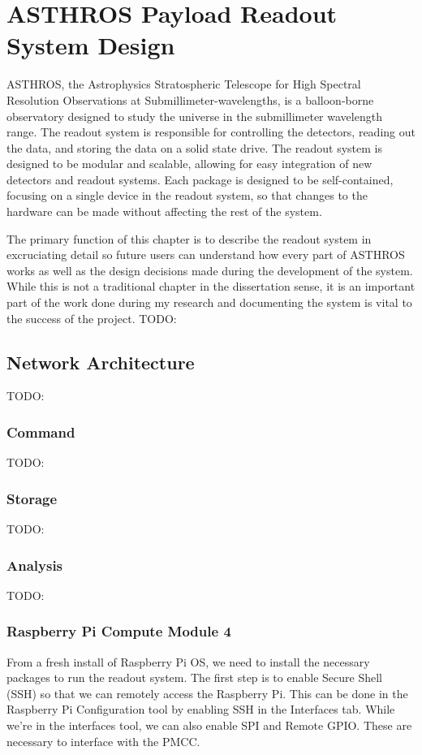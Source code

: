 \chapter[ASTHROS Payload Readout System Design]{ASTHROS Payload Readout System Design}
ASTHROS, the Astrophysics Stratospheric Telescope for High Spectral Resolution Observations at Submillimeter-wavelengths, is a balloon-borne observatory designed to study the universe in the submillimeter wavelength range.
The readout system is responsible for controlling the detectors, reading out the data, and storing the data on a solid state drive.
The readout system is designed to be modular and scalable, allowing for easy integration of new detectors and readout systems.
Each package is designed to be self-contained, focusing on a single device in the readout system, so that changes to the hardware can be made without affecting the rest of the system.

The primary function of this chapter is to describe the readout system in excruciating detail so future users can understand how every part of ASTHROS works as well as the design decisions made during the development of the system.
While this is not a traditional chapter in the dissertation sense, it is an important part of the work done during my research and documenting the system is vital to the success of the project.
TODO:
\section{Network Architecture}
TODO:
\subsection{Command}
TODO:
\subsection{Storage}
TODO:
\subsection{Analysis}
TODO:
\subsection{Raspberry Pi Compute Module 4}
From a fresh install of Raspberry Pi OS, we need to install the necessary packages to run the readout system.
The first step is to enable Secure Shell (SSH) so that we can remotely access the Raspberry Pi.
This can be done in the Raspberry Pi Configuration tool by enabling SSH in the Interfaces tab.
While we're in the interfaces tool, we can also enable SPI and Remote GPIO. 
These are necessary to interface with the PMCC.

